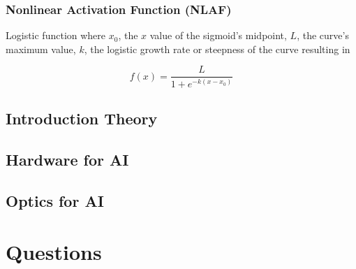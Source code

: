 \documentclass[main.tex]{subfiles}
\begin{document}
\subsubsection{Nonlinear Activation Function (NLAF)}

Logistic function where $x_0$, the $x$ value of the sigmoid's midpoint, $L$, the curve's maximum value, $k$, the logistic growth rate or steepness of the curve resulting in 

$$f(x)=\frac{L}{1+e^{-k\left(x-x_{0}\right)}}$$

\subsection{Introduction Theory}
\subsection{Hardware for AI}
\subsection{Optics for AI}

\section{Questions}
\end{document}
